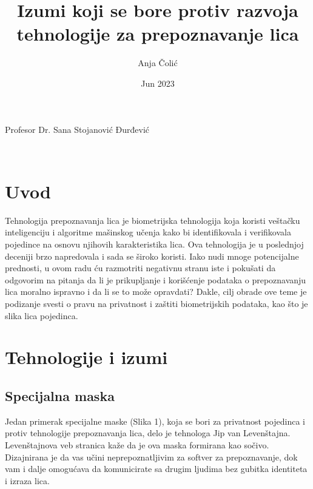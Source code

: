 \documentclass{article}
\title{Izumi koji se bore protiv razvoja tehnologije za prepoznavanje lica}
\author{Anja Čolić}
\date{Jun 2023}
\newcommand{\profesor}{Profesor Dr. Sana Stojanović Đurđević}
\begin{document}

\maketitle

\begin{center}
\profesor
\end{center}


\newpage
{}
\renewcommand{\contentsname}{Sadržaj}
\tableofcontents
\newpage

\





\maketitle

\section{Uvod}

Tehnologija prepoznavanja lica je biometrijska tehnologija koja koristi veštačku inteligenciju i algoritme mašinskog učenja kako bi identifikovala i verifikovala pojedince na osnovu njihovih karakteristika lica. 
\newline
\newline
Ova tehnologija je u poslednjoj deceniji brzo napredovala i sada se široko koristi.
Iako nudi mnoge potencijalne prednosti, u ovom radu ću razmotriti negativnu stranu iste i pokušati da odgovorim na pitanja da li je prikupljanje i korišćenje podataka o prepoznavanju lica moralno ispravno i da li se to može opravdati?
\newline
\newline
Dakle, cilj obrade ove teme je podizanje svesti o pravu na privatnost i zaštiti biometrijskih podataka, kao što je slika lica pojedinca.
\newpage

\section{Tehnologije i izumi}
\subsection{Specijalna maska}
Jedan primerak specijalne maske (Slika 1), koja se bori za privatnost pojedinca i protiv tehnologije prepoznavanja lica, delo je tehnologa Jip van Levenštajna. Levenštajnova veb stranica kaže da je ova maska formirana kao sočivo. Dizajnirana je da vas učini neprepoznatljivim za softver za prepoznavanje, dok vam i dalje omogućava da komunicirate sa drugim ljudima bez gubitka identiteta i izraza lica.
\end{document}
